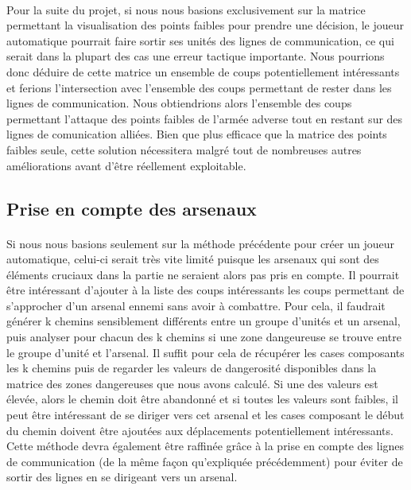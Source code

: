 		\paragraph{}
		Pour la suite du projet, si nous nous basions exclusivement sur la matrice permettant la visualisation des points faibles pour prendre une décision,
		le joueur automatique pourrait faire sortir ses unités des lignes de communication, ce qui serait dans la plupart des cas une erreur tactique importante.
		Nous pourrions donc déduire de cette matrice un ensemble de coups potentiellement intéressants et ferions l'intersection avec l'ensemble
		des coups permettant de rester dans les lignes de communication. Nous obtiendrions alors l'ensemble des coups permettant l'attaque des points faibles
		de l'armée adverse tout en restant sur des lignes de comunication alliées.
		Bien que plus efficace que la matrice des points faibles seule, cette solution nécessitera malgré tout de nombreuses autres améliorations avant d'être
		réellement exploitable.
		
		\subsection{Prise en compte des arsenaux}
		
		\paragraph{}
		Si nous nous basions seulement sur la méthode précédente pour créer un joueur automatique, celui-ci serait très vite limité puisque les arsenaux qui sont des
		éléments cruciaux dans la partie ne seraient alors pas pris en compte.
		Il pourrait être intéressant d'ajouter à la liste des coups intéressants les coups permettant de s'approcher d'un arsenal ennemi sans avoir à combattre.
		Pour cela, il faudrait générer k chemins sensiblement différents entre un groupe d'unités et un arsenal, puis analyser pour chacun des k chemins si une 
		zone dangeureuse se trouve entre le groupe d'unité et l'arsenal.
		Il suffit pour cela de récupérer les cases composants les k chemins puis de regarder les valeurs de dangerosité disponibles dans la matrice des zones dangereuses
		que nous avons calculé.
		Si une des valeurs est élevée, alors le chemin doit être abandonné et si toutes les valeurs sont faibles, il peut être intéressant de se diriger vers cet
		arsenal et les cases composant le début du chemin doivent être ajoutées aux déplacements potentiellement intéressants.
		Cette méthode devra également être raffinée grâce à la prise en compte des lignes de communication (de la même façon qu'expliquée précédemment) pour éviter de 
		sortir des lignes en se dirigeant vers un arsenal.

